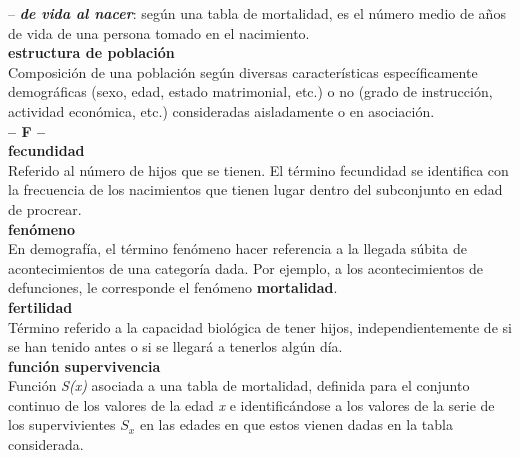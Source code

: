 \begin{multicols}{2}
\vspace{-0.3cm}
--  \textbf{\textit{de vida al nacer}}: según una tabla de mortalidad, es el número medio de años de vida de una persona tomado en el nacimiento.\\

\noindent \textbf{\Large{estructura de población}}\\

\vspace{-0.3cm}
Composición de una población según diversas características específicamente demográficas (sexo, edad, estado matrimonial, etc.) o no (grado de instrucción, actividad económica, etc.) consideradas aisladamente o en asociación.\\

\noindent\textbf{\huge{-- F --}}\\

\noindent \textbf{\Large{fecundidad}}\\

\vspace{-0.3cm}
Referido al número de hijos que se tienen. El término fecundidad se identifica con la frecuencia de los nacimientos que tienen lugar dentro del subconjunto en edad de procrear.\\

\noindent \textbf{\Large{fenómeno}}\\

\vspace{-0.3cm}
En demografía, el término fenómeno hacer referencia a la llegada súbita de acontecimientos de una categoría dada. Por ejemplo, a los acontecimientos de defunciones, le corresponde el fenómeno \textbf{mortalidad}.\\

\noindent \textbf{\Large{fertilidad}}\\

\vspace{-0.3cm}
Término referido a la capacidad biológica de tener hijos, independientemente de si se han tenido antes o si se llegará a tenerlos algún día.\\

\noindent \textbf{\Large{función supervivencia}}\\

\vspace{-0.3cm}
Función \textit{S(x)} asociada a una tabla de mortalidad, definida para el conjunto continuo de los valores de la edad \textit{x} e identificándose a los valores de la serie de los supervivientes $S_{x}$ en las edades en que estos vienen dadas en la tabla considerada.\\


\end{multicols}
